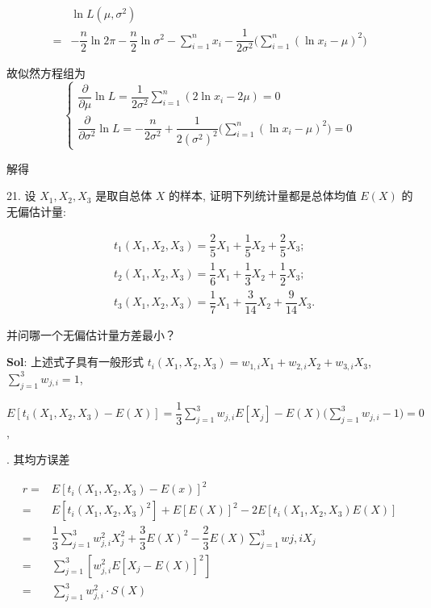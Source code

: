 $$
\begin{aligned}
    &\ln L(\mu,\sigma^2)\\
    =&-\dfrac{n}{2}\ln2\pi-\dfrac{n}{2}\ln\sigma^2-\sum_{i=1}^nx_i-\dfrac{1}{2\sigma^2}\Big(\sum_{i=1}^n(\ln x_i-\mu)^2\Big)
\end{aligned}
$$

故似然方程组为
$$
\begin{cases}
\displaystyle
    \dfrac{\partial}{\partial \mu }\ln L=\dfrac{1}{2\sigma^2}\sum_{i=1}^n(2\ln x_i-2\mu)=0\\
\displaystyle
    \dfrac{\partial}{\partial \sigma^2}\ln L=-\dfrac{n}{2\sigma^2}+\dfrac{1}{2(\sigma^2)^2}\Big(\sum_{i=1}^n(\ln x_i-\mu)^2\Big)=0
\end{cases}
$$

解得 

\vspace{12pt}

21. 设 $X_1,X_2,X_3$ 是取自总体 $X$ 的样本, 证明下列统计量都是总体均值 $E(X)$ 的无偏估计量:

$$
\begin{aligned}
    &t_1(X_1,X_2,X_3)=\dfrac{2}{5}X_1+\dfrac{1}{5}X_2+\dfrac{2}{5}X_3;\\
    &t_2(X_1,X_2,X_3)=\dfrac{1}{6}X_1+\dfrac{1}{3}X_2+\dfrac{1}{2}X_3;\\
    &t_3(X_1,X_2,X_3)=\dfrac{1}{7}X_1+\dfrac{3}{14}X_2+\dfrac{9}{14}X_3.
\end{aligned}
$$

并问哪一个无偏估计量方差最小？

\textbf{Sol}: 上述式子具有一般形式 $t_i(X_1,X_2,X_3)=w_{1,i}X_1+w_{2,i}X_2+w_{3,i}X_3$, $\sum_{j=1}^3w_{j,i}=1$,  

$E[t_i(X_1,X_2,X_3)-E(X)]=\dfrac{1}{3}\sum_{j=1}^3w_{j,i}E[X_j]-E(X)\Big(\sum_{j=1}^3w_{j,i}-1\Big)=0$,

. 其均方误差

$$
\begin{aligned}
    r
    =&E[t_i(X_1,X_2,X_3)-E(x)]^2\\
    =&E[t_i(X_1,X_2,X_3)^2]+E[E(X)]^2-2E[t_i(X_1,X_2,X_3)E(X)]\\
    =&\dfrac{1}{3}\sum_{j=1}^3w_{j,i}^2X_{j}^2+\dfrac{3}{3}E(X)^2-\dfrac{2}{3}E(X)\sum_{j=1}^3w{j,i}X_j\\
    =&\sum_{j=1}^3[w_{j,i}^2E[X_j-E(X)]^2]\\
    =&\sum_{j=1}^3w_{j,i}^2\cdot S(X)
\end{aligned}
$$


